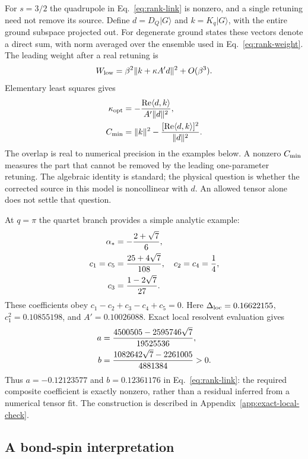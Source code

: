 For $s=3/2$ the quadrupole in Eq.~\eqref{eq:rank-link} is nonzero, and a
single retuning need not remove its source. Define $d=D_Q|G\rangle$ and
$k=K_q|G\rangle$, with the entire ground subspace projected out.
For degenerate ground states these vectors denote a direct sum, with norm
averaged over the ensemble used in Eq.~\eqref{eq:rank-weight}.
The leading weight after a real retuning is
\begin{equation}
 W_{\mathrm{low}}=\beta^2\|k+\kappa A'd\|^2+O(\beta^3).
\end{equation}
Elementary least squares gives
\begin{align}
 \kappa_{\mathrm{opt}}
   &=-\frac{\operatorname{Re}\langle d,k\rangle}{A'\|d\|^2},\\
 C_{\mathrm{min}}&=\|k\|^2-
       \frac{[\operatorname{Re}\langle d,k\rangle]^2}{\|d\|^2}.
 \label{eq:rank-minimum}
\end{align}
The overlap is real to numerical precision in the examples below.
A nonzero $C_{\mathrm{min}}$ measures the part that cannot be removed by the leading
one-parameter retuning. The algebraic identity is standard; the physical
question is whether the corrected source in this model is noncollinear with
$d$. An allowed tensor alone does not settle that question.

At $q=\pi$ the quartet branch provides a simple analytic example:
\begin{align}
 \alpha_*&=-\frac{2+\sqrt7}{6},\notag\\
 c_1=c_5&=\frac{25+4\sqrt7}{108},\quad
 c_2=c_4=\frac14,\notag\\
 c_3&=\frac{1-2\sqrt7}{27}.
 \label{eq:rank-exact-root}
\end{align}
These coefficients obey $c_1-c_2+c_3-c_4+c_5=0$.
Here $\Delta_{\mathrm{loc}}=0.16622155$, $c_1^2=0.10855198$, and
$A'=0.10026088$. Exact local resolvent evaluation gives
\begin{align}
 a&=\frac{4500505-2595746\sqrt7}{19525536},\notag\\
 b&=\frac{1082642\sqrt7-2261005}{4881384}>0.
 \label{eq:exact-local-coefficients}
\end{align}
Thus $a=-0.12123577$ and $b=0.12361176$ in
Eq.~\eqref{eq:rank-link}: the required composite coefficient is exactly
nonzero, rather than a residual inferred from a numerical tensor fit.
The construction is described in Appendix~\ref{app:exact-local-check}.

\subsection{A bond-spin interpretation}

